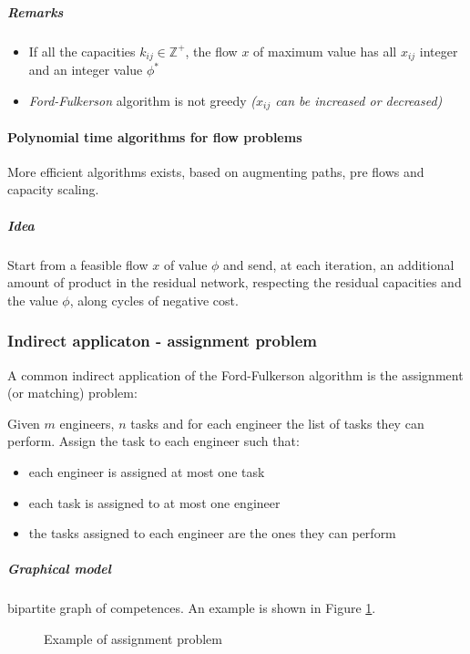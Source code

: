 \documentclass[english]{article}
\begin{document}
\subparagraph*{Remarks}
\begin{itemize}
  \item If all the capacities \(k_{ij} \in \mathbb{Z}^+\), the flow \(x\) of maximum value has all \(x_{ij}\) integer and an integer value \(\phi^\ast\)
  \item \textit{Ford-Fulkerson} algorithm is not greedy \textit{(\(x_{ij}\) can be increased or decreased)}
\end{itemize}

\paragraph{Polynomial time algorithms for flow problems}

More efficient algorithms exists, based on augmenting paths, pre flows and capacity scaling.

\subparagraph*{Idea}
Start from a feasible flow \(x\) of value \(\phi\) and send, at each iteration, an additional amount of product in the residual network, respecting the residual capacities and the value \(\phi\), along cycles of negative cost.

\subsubsection{Indirect applicaton - assignment problem}

A common indirect application of the Ford-Fulkerson algorithm is the assignment (or matching) problem:

Given \(m\) engineers, \(n\) tasks and for each engineer the list of tasks they can perform.
Assign the task to each engineer such that:

\begin{itemize}
  \item each engineer is assigned at most one task
  \item each task is assigned to at most one engineer
  \item the tasks assigned to each engineer are the ones they can perform
\end{itemize}

\subparagraph*{Graphical model}
bipartite graph of competences.
An example is shown in Figure \ref{fig:assignment-example}.

\begin{figure}[htbp]
  \bigskip
  \centering
  \caption{Example of assignment problem}
  \label{fig:assignment-example}
  \bigskip
\end{figure}
\end{document}
